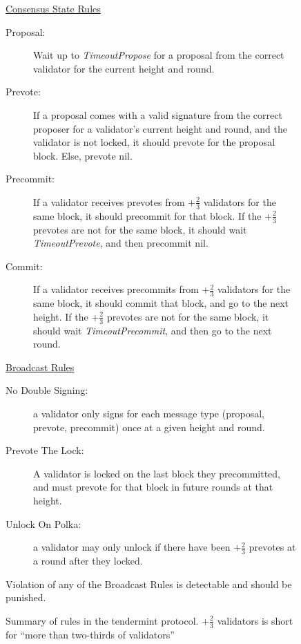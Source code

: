 \begin{figure}[]
	\underline{Consensus State Rules}
		\begin{description}
			\item[Proposal:] Wait up to \emph{TimeoutPropose} for a proposal from the correct validator for the current height and round.
			\item[Prevote:]  If a proposal comes with a valid signature from the correct proposer for a validator’s current height and round, and the validator is not locked, it should prevote for the proposal block. Else, prevote nil.
			\item[Precommit:] If a validator receives prevotes from $+\frac{2}{3}$ validators for the same block, it should precommit for that block. If the $+\frac{2}{3}$ prevotes are not for the same block, it should wait \emph{TimeoutPrevote}, and then precommit nil.
			\item[Commit:] If a validator receives precommits from $+\frac{2}{3}$ validators for the same block, it should commit that block, and go to the next height.  If the $+\frac{2}{3}$ prevotes are not for the same block, it should wait \emph{TimeoutPrecommit}, and then go to the next round.
		\end{description}

	\underline{Broadcast Rules}
		\begin{description}
			\item[No Double Signing:] a validator only signs for each message type (proposal, prevote, precommit) once at a given height and round.
			\item[Prevote The Lock:] A validator is locked on the last block they precommitted, and must prevote for that block in future rounds at that height.
			\item[Unlock On Polka:] a validator may only unlock if there have been $+\frac{2}{3}$ prevotes at a round after they locked. 
		\end{description}
		Violation of any of the Broadcast Rules is detectable and should be punished.

	\caption[Summary of Tendermint protocol rules]{Summary of rules in the tendermint protocol. 
$+\frac{2}{3}$ validators is short for ``more than two-thirds of validators''}

	\label{fig:tendermint_summary}
\end{figure}




